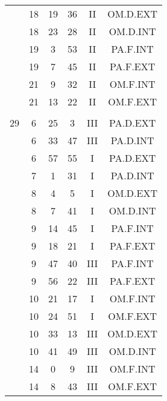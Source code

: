 \documentclass[12pt, a4paper]{article}
\begin{document}
\begin{multicols}{3}
{\begin{tabular}{c c c c c c}
	 	 	 	 & 18 & 19 & 36 & II & OM.D.EXT\\%
	 	 	 	 & 18 & 23 & 28 & II & OM.D.INT\\%
	 	 	 	 & 19 & 3 & 53 & II & PA.F.INT\\%
	 	 	 	 & 19 & 7 & 45 & II & PA.F.EXT\\%
	 	 	 	 & 21 & 9 & 32 & II & OM.F.INT\\%
	 	 	 	 & 21 & 13 & 22 & II & OM.F.EXT\\%
	 	 	 	 & & & & & \\%
	 	 	 	29 & 6 & 25 & 3 & III & PA.D.EXT\\%
	 	 	 	 & 6 & 33 & 47 & III & PA.D.INT\\%
	 	 	 	 & 6 & 57 & 55 & I & PA.D.EXT\\%
	 	 	 	 & 7 & 1 & 31 & I & PA.D.INT\\%
	 	 	 	 & 8 & 4 & 5 & I & OM.D.EXT\\%
	 	 	 	 & 8 & 7 & 41 & I & OM.D.INT\\%
	 	 	 	 & 9 & 14 & 45 & I & PA.F.INT\\%
	 	 	 	 & 9 & 18 & 21 & I & PA.F.EXT\\%
	 	 	 	 & 9 & 47 & 40 & III & PA.F.INT\\%
	 	 	 	 & 9 & 56 & 22 & III & PA.F.EXT\\%
	 	 	 	 & 10 & 21 & 17 & I & OM.F.INT\\%
	 	 	 	 & 10 & 24 & 51 & I & OM.F.EXT\\%
	 	 	 	 & 10 & 33 & 13 & III & OM.D.EXT\\%
	 	 	 	 & 10 & 41 & 49 & III & OM.D.INT\\%
	 	 	 	 & 14 & 0 & 9 & III & OM.F.INT\\%
	 	 	 	 & 14 & 8 & 43 & III & OM.F.EXT\\%

\end{tabular}}
\end{multicols}
\end{document}
